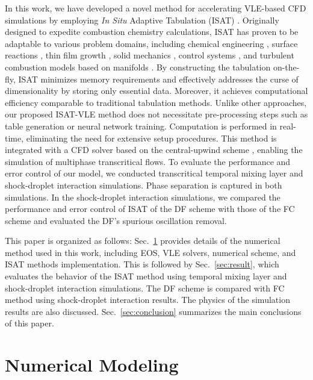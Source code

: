In this work, we have developed a novel method for accelerating VLE-based CFD simulations by employing \textit{In Situ} Adaptive Tabulation (ISAT) \cite{pope1997computationally}. Originally designed to expedite combustion chemistry calculations, ISAT has proven to be adaptable to various problem domains, including chemical engineering \cite{shah1999computational,kolhapure2005pdf,10.1115/1.2709655}, surface reactions \cite{mazumder2005adaptation}, thin film growth \cite{varshney2005multiscale}, solid mechanics \cite{arsenlis2006generalized}, control systems \cite{hedengren2008approximate}, and turbulent combustion models based on manifolds \cite{lacey2021situ}. By constructing the tabulation on-the-fly, ISAT minimizes memory requirements and effectively addresses the curse of dimensionality by storing only essential data. Moreover, it achieves computational efficiency comparable to traditional tabulation methods. Unlike other approaches, our proposed ISAT-VLE method does not necessitate pre-processing steps such as table generation or neural network training. Computation is performed in real-time, eliminating the need for extensive setup procedures. This method is integrated with a CFD solver based on the central-upwind scheme \cite{kurganov2000new,greenshields2010implementation}, enabling the simulation of multiphase transcritical flows. To evaluate the performance and error control of our model, we conducted transcritical temporal mixing layer and shock-droplet interaction simulations. Phase separation is captured in both simulations. In the shock-droplet interaction simulations, we compared the performance and error control of ISAT of the DF scheme with those of the FC scheme and evaluated the DF's spurious oscillation removal. 

This paper is organized as follows: Sec.~\ref{sec:model} provides details of the numerical method used in this work, including EOS, VLE solvers, numerical scheme, and ISAT methods implementation.  This is followed by Sec.~\ref{sec:result}, which evaluates the behavior of the ISAT method using temporal mixing layer and shock-droplet interaction simulations. The DF scheme is compared with FC method using shock-droplet interaction results. The physics of the simulation results are also discussed. Sec.~\ref{sec:conclusion} summarizes the main conclusions of this paper. 

\section{Numerical Modeling}
\label{sec:model}




